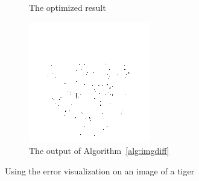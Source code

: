 \begin{figure}
\begin{subfigure}[b]{0.3\textwidth}
                \caption{The optimized result}
                \label{fig:tiger_out}
        \end{subfigure}
        \begin{subfigure}[b]{0.3\textwidth}
                \includegraphics[width=\textwidth]{images/tiger_diff}
                \caption{The output of Algorithm~\ref{alg:imgdiff}}
                \label{fig:tiger_diff}
        \end{subfigure}
        \caption{Using the error visualization on an image of a tiger}\label{fig:imgdiff}
\end{figure}